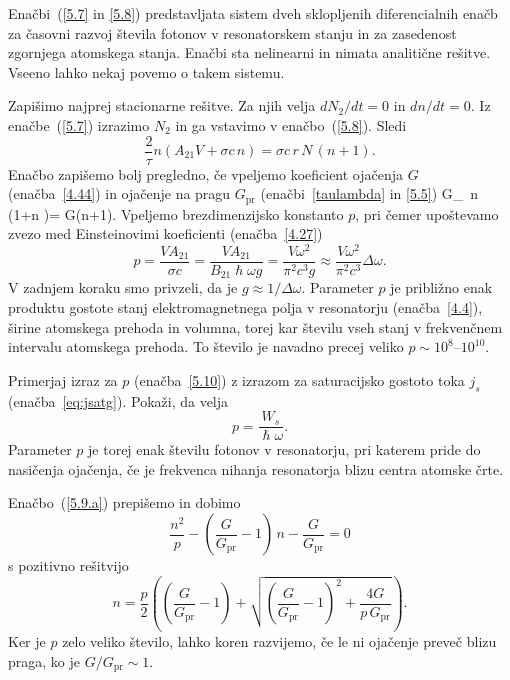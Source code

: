 Enačbi~(\ref{5.7} in \ref{5.8}) predstavljata sistem dveh sklopljenih diferencialnih enačb za 
časovni razvoj števila fotonov v resonatorskem stanju in za zasedenost 
zgornjega atomskega stanja. Enačbi sta nelinearni in nimata  
analitične rešitve. Vseeno lahko nekaj povemo o takem sistemu.

Zapišimo najprej stacionarne rešitve. Za njih velja $dN_2/dt=0$ in 
$dn/dt=0$. Iz enačbe~(\ref{5.7}) izrazimo $N_{2}$ in ga vstavimo v enačbo~(\ref{5.8}).
Sledi 
\begin{equation}
\frac{2}{\tau }n\left(A_{21}V+\sigma c\,n\right)=
\sigma c\, r\,N\,(n+1).
\label{5.9}
\end{equation}
Enačbo zapišemo bolj pregledno, če vpeljemo koeficient ojačenja $G$ (enačba~\ref{4.44})
in ojačenje na pragu $G_\mathrm{pr}$ (enačbi~\ref{taulambda} in \ref{5.5})
\beq
G_\, n\, \left(1+n \right)= G(n+1).
\label{5.9.a}
\eeq
Vpeljemo brezdimenzijsko konstanto $p$, pri čemer upoštevamo zvezo
med Einsteinovimi koeficienti (enačba~\ref{4.27})
\begin{equation}
p=\frac{VA_{21}}{\sigma c} = 
\frac{VA_{21}}{B_{21}\hslash \omega g}=\frac{V\omega ^{2}}{\pi
^{2}c^{3}g}\approx
\frac{V\omega ^{2}}{\pi ^{2}c^{3}}\Delta \omega.  
\label{5.10}
\end{equation}
V zadnjem koraku smo privzeli, da je $g\approx 1/\Delta \omega $. 
Parameter $p$ je približno enak produktu 
gostote stanj elektromagnetnega polja v resonatorju (enačba~\ref{4.4}),
širine atomskega prehoda in volumna, torej kar številu vseh stanj 
v frekvenčnem intervalu atomskega prehoda. To število je navadno precej 
veliko $p \sim 10^{8}$--$10^{10}$. 

\begin{naloga}
Primerjaj izraz za $p$ (enačba~\ref{5.10}) z izrazom za saturacijsko 
gostoto toka $j_s$ (enačba~\ref{eq:jsatg}). Pokaži, da velja
\begin{equation}
p = \frac{W_s}{\hslash \omega}.
\end{equation}
Parameter $p$ je torej enak številu fotonov v resonatorju, pri katerem pride 
do nasičenja ojačenja, če je frekvenca nihanja resonatorja blizu 
centra atomske črte. 
\end{naloga}

Enačbo~(\ref{5.9.a}) prepišemo in dobimo
\begin{equation}
\frac{n^2}{p}-\left(\frac{G}{G_\mathrm{pr}}-1\right)\,n-\frac{G}{G_\mathrm{pr}}=0
\label{5.11}
\end{equation}
s pozitivno rešitvijo 
\begin{equation}
n=\frac{p}{2}\left( \left(\frac{G}{G_\mathrm{pr}}-1\right)+\sqrt{\left(\frac{G}{G_\mathrm{pr}}
-1\right)^{2}+ \frac{4G}{p\,G_\mathrm{pr}}}\right).
\label{5.12}
\end{equation}
Ker je $p$ zelo veliko število, lahko koren razvijemo, če le ni ojačenje
preveč blizu praga, ko je $G/G_\mathrm{pr}\sim 1$. 

